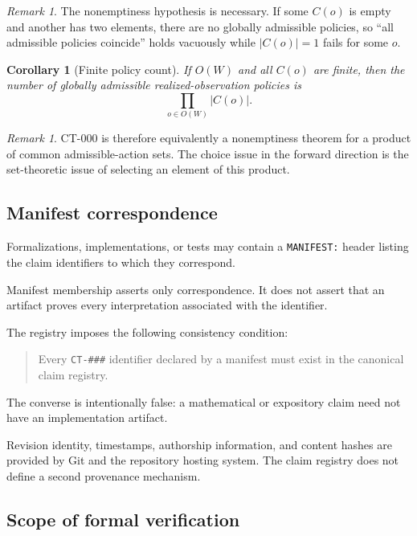 \documentclass[11pt]{article}
\newtheorem{corollary}[theorem]{Corollary}
\theoremstyle{definition}
\theoremstyle{remark}
\newtheorem{remark}[theorem]{Remark}
\newcommand{\worlds}{W}
\begin{document}
\begin{remark}
The nonemptiness hypothesis is necessary. If some $C(o)$ is empty and another
has two elements, there are no globally admissible policies, so ``all
admissible policies coincide'' holds vacuously while $|C(o)|=1$ fails for
some $o$.
\end{remark}

\begin{corollary}[Finite policy count]
If $O(\worlds)$ and all $C(o)$ are finite, then the number of globally
admissible realized-observation policies is
\[
  \prod_{o\in O(\worlds)} |C(o)|.
\]
\end{corollary}

\begin{remark}
CT-000 is therefore equivalently a nonemptiness theorem for a product of
common admissible-action sets. The choice issue in the forward direction is
the set-theoretic issue of selecting an element of this product.
\end{remark}


\subsection{Manifest correspondence}

Formalizations, implementations, or tests may contain a \texttt{MANIFEST:}
header listing the claim identifiers to which they correspond.

Manifest membership asserts only correspondence. It does not assert that an
artifact proves every interpretation associated with the identifier.

The registry imposes the following consistency condition:

\begin{quote}
Every \texttt{CT-\#\#\#} identifier declared by a manifest must exist in the
canonical claim registry.
\end{quote}

The converse is intentionally false: a mathematical or expository claim need
not have an implementation artifact.

Revision identity, timestamps, authorship information, and content hashes are
provided by Git and the repository hosting system. The claim registry does
not define a second provenance mechanism.

\subsection{Scope of formal verification}
\end{document}
